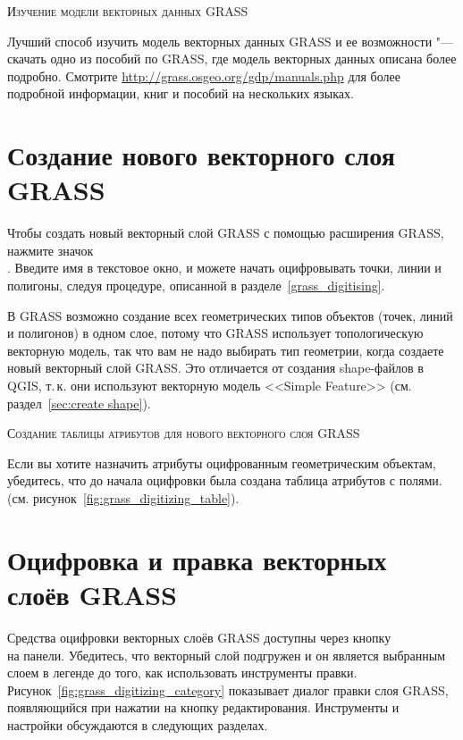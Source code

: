 \begin{Tip}\caption{\textsc{Изучение модели векторных данных GRASS}}
Лучший способ изучить модель векторных данных GRASS и ее возможности "---
скачать одно из пособий по GRASS, где модель векторных данных описана
более подробно. Смотрите \url{http://grass.osgeo.org/gdp/manuals.php}
для более подробной информации, книг и пособий на нескольких языках.
\end{Tip}

\section{Создание нового векторного слоя GRASS}\label{sec:creating_new_grass_vectors}

Чтобы создать новый векторный слой GRASS с помощью расширения GRASS,
нажмите значок \\
.
Введите имя в текстовое окно, и можете начать оцифровывать точки, линии
и полигоны, следуя процедуре, описанной в разделе~\ref{grass_digitising}.

В GRASS возможно создание всех геометрических типов объектов (точек,
линий и полигонов) в одном слое, потому что GRASS использует
топологическую векторную модель, так что вам не надо выбирать тип
геометрии, когда создаете новый векторный слой GRASS. Это отличается от
создания shape-файлов в QGIS, т.\,к. они используют векторную модель
<<Simple Feature>> (см. раздел~\ref{sec:create shape}).

\begin{Tip}\caption{\textsc{Создание таблицы атрибутов для нового векторного слоя GRASS}}
Если вы хотите назначить атрибуты оцифрованным геометрическим объектам,
убедитесь, что до начала оцифровки была создана таблица атрибутов с полями.
(см. рисунок~\ref{fig:grass_digitizing_table}).
\end{Tip}

\section{Оцифровка и правка векторных слоёв GRASS}\label{grass_digitising}

Средства оцифровки векторных слоёв GRASS доступны через кнопку \\
 на панели.
Убедитесь, что векторный слой подгружен и он является выбранным слоем в
легенде до того, как использовать инструменты правки.
Рисунок~\ref{fig:grass_digitizing_category} показывает диалог правки
слоя GRASS, появляющийся при нажатии на кнопку редактирования.
Инструменты и настройки обсуждаются в следующих разделах.

